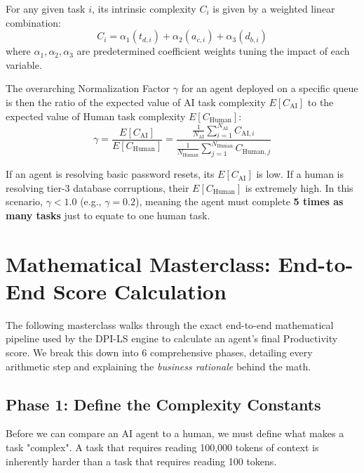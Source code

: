 \documentclass[11pt,a4paper]{article}
\begin{document}
For any given task $i$, its intrinsic complexity $C_i$ is given by a weighted linear combination:
\[
C_i = \alpha_1(t_{d, i}) + \alpha_2(a_{c, i}) + \alpha_3(d_{b, i})
\]
where $\alpha_1, \alpha_2, \alpha_3$ are predetermined coefficient weights tuning the impact of each variable.

The overarching Normalization Factor $\gamma$ for an agent deployed on a specific queue is then the ratio of the expected value of AI task complexity $E[C_{\text{AI}}]$ to the expected value of Human task complexity $E[C_{\text{Human}}]$:
\[
\gamma = \frac{E[C_{\text{AI}}]}{E[C_{\text{Human}}]} = \frac{\frac{1}{N_{\text{AI}}} \sum_{i=1}^{N_{\text{AI}}} C_{\text{AI}, i}}{\frac{1}{N_{\text{Human}}} \sum_{j=1}^{N_{\text{Human}}} C_{\text{Human}, j}}
\]

\begin{dpiimportant}
If an agent is resolving basic password resets, its $E[C_{\text{AI}}]$ is low. If a human is resolving tier-3 database corruptions, their $E[C_{\text{Human}}]$ is extremely high. In this scenario, $\gamma < 1.0$ (e.g., $\gamma = 0.2$), meaning the agent must complete \textbf{5 times as many tasks} just to equate to one human task.
\end{dpiimportant}

\vspace{0.5cm}

\newpage
\section{Mathematical Masterclass: End-to-End Score Calculation}

The following masterclass walks through the exact end-to-end mathematical pipeline used by the DPI-LS engine to calculate an agent's final Productivity score. We break this down into 6 comprehensive phases, detailing every arithmetic step and explaining the \textit{business rationale} behind the math.

\vspace{0.5cm}

\subsection{Phase 1: Define the Complexity Constants}

Before we can compare an AI agent to a human, we must define what makes a task "complex". A task that requires reading 100,000 tokens of context is inherently harder than a task that requires reading 100 tokens. 
\end{document}
